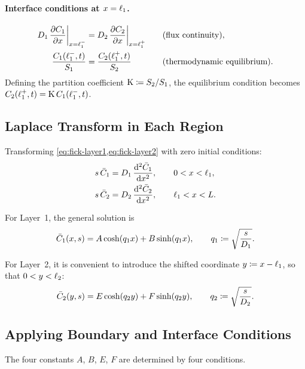 \paragraph{Interface conditions at $x = \ell_{1}$.}
\begin{align}
  \label{eq:interface-flux}
  D_{1}\,\pdv{C_1}{x}\bigg|_{x=\ell_{1}^-}
    &= D_{2}\,\pdv{C_2}{x}\bigg|_{x=\ell_{1}^+}
    &\quad&\text{(flux continuity)},\\
  \label{eq:interface-equil}
  \frac{C_1(\ell_{1}^-,t)}{S_{1}}
    &= \frac{C_2(\ell_{1}^+,t)}{S_{2}}
    &\quad&\text{(thermodynamic equilibrium)}.
\end{align}
Defining the partition coefficient $\mathrm{K} \coloneqq S_{2}/S_{1}$, the
equilibrium condition becomes $C_2(\ell_{1}^+,t) = \mathrm{K}\,C_1(\ell_{1}^-,t)$.

\subsection{Laplace Transform in Each Region}
\label{sec:two-laplace}

Transforming \cref{eq:fick-layer1,eq:fick-layer2} with zero initial conditions:
\begin{align}
  s\,\bar{C}_1 &= D_{1}\,\dv[2]{\bar{C}_1}{x}, \qquad 0 < x < \ell_{1},\\
  s\,\bar{C}_2 &= D_{2}\,\dv[2]{\bar{C}_2}{x}, \qquad \ell_{1} < x < L.
\end{align}

For Layer~1, the general solution is
\begin{equation}
  \label{eq:C1bar-general}
  \bar{C}_1(x,s) = A\cosh(q_1 x) + B\sinh(q_1 x),
  \qquad q_1 \coloneqq \sqrt{\frac{s}{D_{1}}}.
\end{equation}

For Layer~2, it is convenient to introduce the shifted coordinate
$y \coloneqq x - \ell_{1}$, so that $0 < y < \ell_{2}$:
\begin{equation}
  \label{eq:C2bar-general}
  \bar{C}_2(y,s) = E\cosh(q_2 y) + F\sinh(q_2 y),
  \qquad q_2 \coloneqq \sqrt{\frac{s}{D_{2}}}.
\end{equation}

\subsection{Applying Boundary and Interface Conditions}
\label{sec:two-layer-system}

The four constants $A$, $B$, $E$, $F$ are determined by four conditions.

